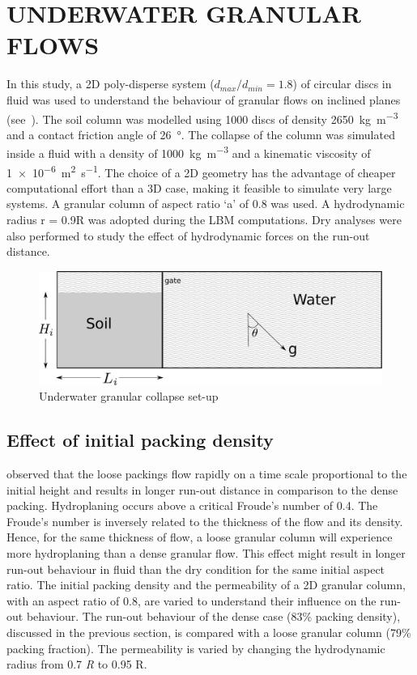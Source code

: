 \documentclass[12pt,a4paper,twocolumn,fleqn]{narms}
\begin{document}
\section{UNDERWATER GRANULAR FLOWS}
In this study, a 2D poly-disperse system ($d_{max}/d_{min} = 1.8$) of circular discs in fluid was used to understand the behaviour of granular flows on inclined planes (see~). The soil column was modelled using 1000 discs of density \SI{2650}{\kg\per\cubic\meter} and a contact friction angle of \SI{26}{\degree}. The collapse of the column was simulated inside a fluid with a density of \SI{1000}{\kg\per\cubic\meter}  and a kinematic viscosity of \SI{1e-6}{\square\meter\per\second}. The choice of a 2D geometry has the advantage of cheaper computational effort than a 3D case, making it feasible to simulate very large systems. A granular column of aspect ratio `a' of 0.8 was used. A hydrodynamic radius r = 0.9R was adopted during the LBM computations. Dry analyses were also performed to study the effect of hydrodynamic forces on the run-out distance.

\begin{figure}[htpb]
\includegraphics[width=0.97\columnwidth]{figs/geometry.pdf}
\caption{Underwater granular collapse set-up}
\label{fig:setup}
\end{figure}

\subsection{Effect of initial packing density}

 observed that the loose packings flow rapidly on a time
scale proportional to the initial height and results in longer run-out distance 
in comparison to the dense packing. Hydroplaning occurs above a critical 
Froude's number of 0.4. The Froude's number is inversely related to the 
thickness of the flow and its density. Hence, for the same thickness of flow, a 
loose granular column will experience more hydroplaning than a dense granular 
flow. This effect might result in longer run-out behaviour in fluid than the 
dry condition for the same initial aspect ratio. The initial packing density 
and the permeability of a 2D granular column, with an aspect ratio of 0.8, are 
varied to understand their influence on the run-out behaviour. The run-out 
behaviour of the dense case (83\% packing density), discussed in the previous 
section, is compared with a loose granular column (79\% packing fraction). The 
permeability is varied by changing the hydrodynamic radius from 0.7 \textit{R} 
to 0.95 
R. 
\end{document}
